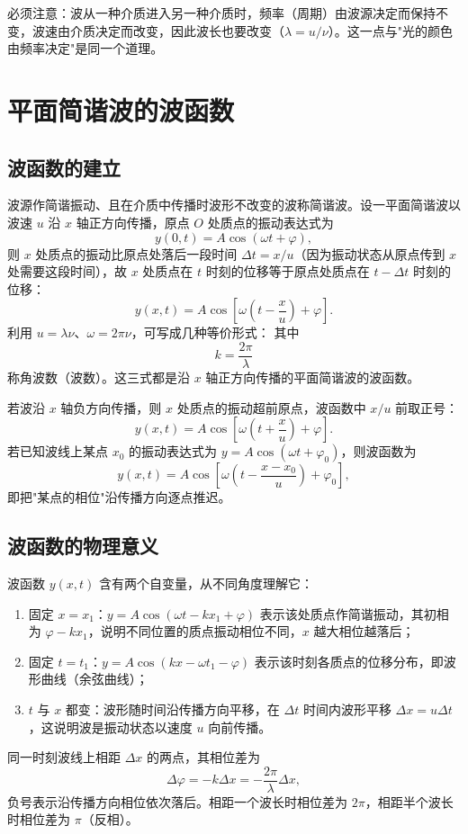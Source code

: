     必须注意：波从一种介质进入另一种介质时，频率（周期）由波源决定而保持不变，波速由介质决定而改变，因此波长也要改变（$\lambda=u/\nu$）。这一点与"光的颜色由频率决定"是同一个道理。


\section{平面简谐波的波函数}
    \subsection{波函数的建立}
    波源作简谐振动、且在介质中传播时波形不改变的波称简谐波。设一平面简谐波以波速 $u$ 沿 $x$ 轴正方向传播，原点 $O$ 处质点的振动表达式为
    \[
    y(0,t)=A\cos(\omega t+\varphi),
    \]
    则 $x$ 处质点的振动比原点处落后一段时间 $\Delta t=x/u$（因为振动状态从原点传到 $x$ 处需要这段时间），故 $x$ 处质点在 $t$ 时刻的位移等于原点处质点在 $t-\Delta t$ 时刻的位移：
    \[
    y(x,t)=A\cos\left[\omega\left(t-\frac{x}{u}\right)+\varphi\right].
    \]
    利用 $u=\lambda\nu$、$\omega=2\pi\nu$，可写成几种等价形式：
    其中
    \[
    k=\frac{2\pi}{\lambda}
    \]
    称角波数（波数）。这三式都是沿 $x$ 轴正方向传播的平面简谐波的波函数。

    若波沿 $x$ 轴负方向传播，则 $x$ 处质点的振动超前原点，波函数中 $x/u$ 前取正号：
    \[
    y(x,t)=A\cos\left[\omega\left(t+\frac{x}{u}\right)+\varphi\right].
    \]
    若已知波线上某点 $x_0$ 的振动表达式为 $y=A\cos(\omega t+\varphi_0)$，则波函数为
    \[
    y(x,t)=A\cos\left[\omega\left(t-\frac{x-x_0}{u}\right)+\varphi_0\right],
    \]
    即把"某点的相位"沿传播方向逐点推迟。

    \subsection{波函数的物理意义}
    波函数 $y(x,t)$ 含有两个自变量，从不同角度理解它：
    \begin{enumerate}
        \item 固定 $x=x_1$：$y=A\cos(\omega t-kx_1+\varphi)$ 表示该处质点作简谐振动，其初相为 $\varphi-kx_1$，说明不同位置的质点振动相位不同，$x$ 越大相位越落后；
        \item 固定 $t=t_1$：$y=A\cos(kx-\omega t_1-\varphi)$ 表示该时刻各质点的位移分布，即波形曲线（余弦曲线）；
        \item $t$ 与 $x$ 都变：波形随时间沿传播方向平移，在 $\Delta t$ 时间内波形平移 $\Delta x=u\Delta t$，这说明波是振动状态以速度 $u$ 向前传播。
    \end{enumerate}
    同一时刻波线上相距 $\Delta x$ 的两点，其相位差为
    \[
    \Delta\varphi=-k\Delta x=-\frac{2\pi}{\lambda}\Delta x,
    \]
    负号表示沿传播方向相位依次落后。相距一个波长时相位差为 $2\pi$，相距半个波长时相位差为 $\pi$（反相）。

